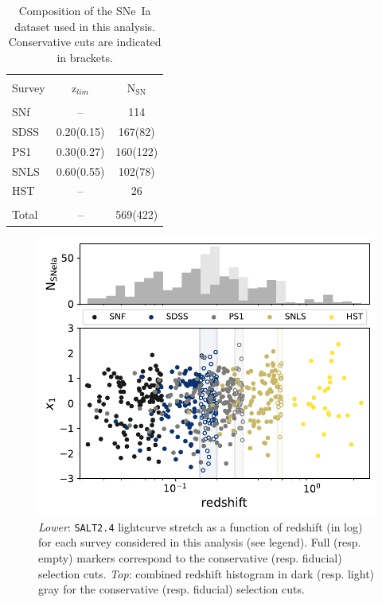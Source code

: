 \documentclass[]{aa} %
\begin{document}
\begin{table}
    \centering
    \caption{Composition of the SNe~Ia dataset used in this analysis.
    Conservative cuts are indicated in brackets.}
    \label{tab:sample}
    \begin{tabular}{l c c}
    \hline\hline\\[-0.8em]
        Survey & z$_{lim}$ & N$_{\mathrm{SN}}$ \\[0.15em]
        \hline\\[-0.8em]
        SNf & -- & 114\\[0.30em]
        SDSS & 0.20(0.15) & 167(82)\\[0.30em]
        PS1 & 0.30(0.27) & 160(122)\\[0.30em]        
        SNLS & 0.60(0.55) & 102(78)\\[0.30em]
        HST & -- & 26\\[0.30em]
        \hline\\[-0.8em]
        Total & -- & 569(422)\\[0.30em]
        \hline
    \end{tabular}
\end{table}

\begin{figure}
    \centering
    \includegraphics[width=0.95\linewidth]{Article_figures/stretchs-cut_btw_hist_cumu_75-lb-cividis.pdf}
    \caption{\textit{Lower}: \textsc{\texttt{SALT2.4}} lightcurve stretch as a
        function of redshift (in log) for each survey considered in this
        analysis (see legend).  Full (resp. empty) markers correspond to the
        conservative (resp. fiducial) selection cuts. \textit{Top}: combined
        redshift histogram in dark (resp. light) gray for the conservative
    (resp. fiducial) selection cuts.}
    \label{fig:sample}
\end{figure}
\end{document}
